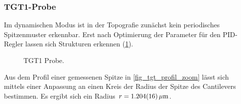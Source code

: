 \documentclass[
	a4paper,
	12pt,
	pagesize,
	ngerman
]{scrartcl}
\begin{document}
\subsubsection{TGT1-Probe}

Im dynamischen Modus ist in der Topografie zunächst kein periodisches Spitzenmuster erkennbar.
Erst nach Optimierung der Parameter für den PID-Regler lassen sich Strukturen erkennen (\cref{fig_tgt}).

\begin{figure}[H]
			\caption{TGT1 Probe.}
			\label{fig_tgt}
\end{figure}

Aus dem Profil einer gemessenen Spitze in \cref{fig_tgt_profil_zoom} lässt sich mittels einer Anpassung an einen Kreis der Radius der Spitze des Cantilevers bestimmen.
Es ergibt sich ein Radius $r=\SI{1.204 +-0.016}{\mu m}$.
\end{document}
